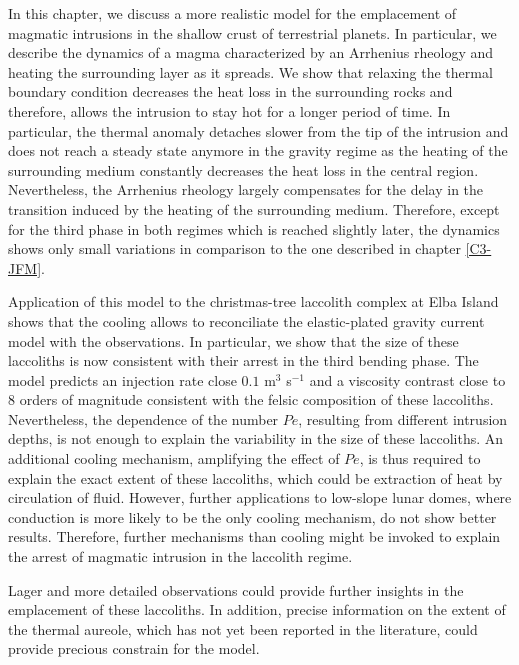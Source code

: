 In this chapter, we discuss a more realistic model for the emplacement
of magmatic intrusions in the shallow crust of terrestrial planets. In
particular, we  describe the dynamics  of a magma characterized  by an
Arrhenius rheology  and heating the  surrounding layer as  it spreads.
We show  that relaxing  the thermal  boundary condition  decreases the
heat loss in the surrounding rocks and therefore, allows the intrusion
to stay hot for a longer period of time.  In particular, the thermal
anomaly detaches  slower from the  tip of  the intrusion and  does not
reach a steady  state anymore in the gravity regime  as the heating of
the  surrounding medium  constantly  decreases the  heat  loss in  the
central   region.   Nevertheless,   the  Arrhenius   rheology  largely
compensates for the delay in the  transition induced by the heating of
the surrounding medium. Therefore, except  for the third phase in both
regimes which is reached slightly later, the dynamics shows only small
variations in comparison to the one described in chapter \ref{C3-JFM}.

Application of this  model to the christmas-tree  laccolith complex at
Elba  Island  shows  that  the  cooling  allows  to  reconciliate  the
elastic-plated  gravity  current  model  with  the  observations.   In
particular,  we  show  that  the  size  of  these  laccoliths  is  now
consistent with  their arrest in  the third bending phase.   The model
predicts an injection rate close  $0.1$ m$^3$ s$^{-1}$ and a viscosity
contrast close to  $8$ orders of magnitude consistent  with the felsic
composition of these laccoliths.   Nevertheless, the dependence of the
number $Pe$, resulting from different  intrusion depths, is not enough
to  explain the  variability  in  the size  of  these laccoliths.   An
additional cooling mechanism,  amplifying the effect of  $Pe$, is thus
required to explain the exact  extent of these laccoliths, which could
be  extraction of  heat  by circulation  of  fluid.  However,  further
applications to low-slope lunar domes, where conduction is more likely
to  be  the  only  cooling  mechanism, do  not  show  better  results.
Therefore, further mechanisms than cooling might be invoked to explain
the arrest of magmatic intrusion in the laccolith regime.

Lager and more detailed observations could provide further insights in
the emplacement of these  laccoliths. In addition, precise information
on the extent of the thermal  aureole, which has not yet been reported
in the literature, could provide precious constrain for the model.


